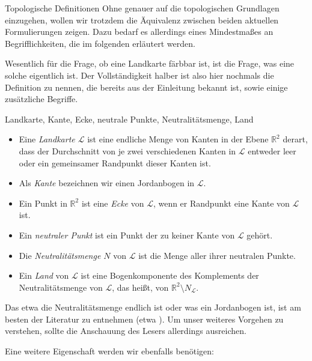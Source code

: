 \begin{section}{Topologische Definitionen}
 Ohne genauer auf die topologischen Grundlagen einzugehen, wollen wir trotzdem die Äquivalenz zwischen beiden aktuellen Formulierungen zeigen. Dazu bedarf es allerdings eines Mindestmaßes an Begrifflichkeiten, die im folgenden erläutert werden.
 
 Wesentlich für die Frage, ob eine Landkarte färbbar ist, ist die Frage, was eine solche eigentlich ist. Der Vollständigkeit halber ist also hier nochmals die Definition zu nennen, die bereits aus der Einleitung bekannt ist, sowie einige zusätzliche Begriffe.
 
 \begin{definition}{Landkarte, Kante, Ecke, neutrale Punkte, Neutralitätsmenge, Land}
  \-\ 
  \begin{itemize}
    \item Eine \textit{Landkarte $\mathcal{L}$} ist eine endliche Menge von Kanten in der Ebene $\mathbb{R}^2$ derart, dass der Durchschnitt von je zwei verschiedenen Kanten in $\mathcal{L}$ entweder leer oder ein gemeinsamer Randpunkt dieser Kanten ist. 
    \item Als \textit{Kante} bezeichnen wir einen Jordanbogen in $\mathcal{L}$.
    \item Ein Punkt in $\mathbb{R}^2$ ist eine \textit{Ecke} von $\mathcal{L}$, wenn er Randpunkt eine Kante von $\mathcal{L}$ ist. 
    \item Ein \textit{neutraler Punkt} ist ein Punkt der zu keiner Kante von $\mathcal{L}$ gehört.
    \item Die \textit{Neutralitätsmenge $N$} von $\mathcal{L}$ ist die Menge aller ihrer neutralen Punkte. 
    \item Ein \textit{Land} von $\mathcal{L}$ ist eine Bogenkomponente des Komplements der Neutralitätsmenge von $\mathcal{L}$, das heißt, von $\mathbb{R}^2 \setminus N_{\mathcal{L}}$.
  \end{itemize}
 \end{definition}
 
 Das etwa die Neutralitätsmenge endlich ist oder was ein Jordanbogen ist, ist am besten der Literatur zu entnehmen (etwa \cite[Kapitel 2]{fritsch}). Um unser weiteres Vorgehen zu verstehen, sollte die Anschauung des Lesers allerdings ausreichen.
 
 Eine weitere Eigenschaft werden wir ebenfalls benötigen:
 

\end{section}
